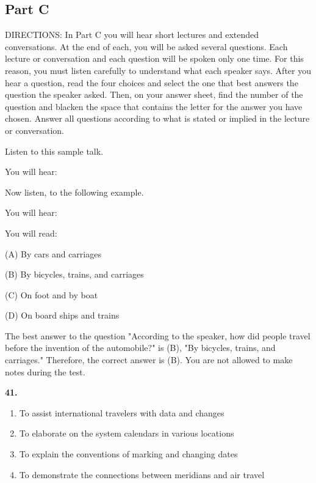 \documentclass[12pt]{article}
\begin{document}
\subsection*{Part C}
DIRECTIONS: In Part C you will hear short lectures and extended conversations. At the end of each, you will be asked several questions. Each lecture or conversation and each question will be spoken only one time. For this reason, you must listen carefully to understand what each speaker says. After you hear a question, read the four choices and select the one that best answers the question the speaker asked. Then, on your answer sheet, find the number of the question and blacken the space that contains the letter for the answer you have chosen. Answer all questions according to what is stated or implied in the lecture or conversation.\par
\begin{exampleblock}
Listen to this sample talk.\par
You will hear:\par
Now listen, to the following example.\par
You will hear:\par
You will read:\par
(A) By cars and carriages\par
(B) By bicycles, trains, and carriages\par
(C) On foot and by boat\par
(D) On board ships and trains\par
The best answer to the question "According to the speaker, how did people travel before the invention of the automobile?" is (B), "By bicycles, trains, and carriages." Therefore, the correct answer is (B). You are not allowed to make notes during the test.\par
\end{exampleblock}
\noindent\textbf{41.}
\begin{enumerate}[label=(\Alph*),leftmargin=*,itemsep=0.2em]
\item To assist international travelers with data and changes
\item To elaborate on the system calendars in various locations
\item To explain the conventions of marking and changing dates
\item To demonstrate the connections between meridians and air travel
\end{enumerate}
\par
\begingroup
\setlength{\parskip}{0pt}
\setlength{\parindent}{0pt}
\end{document}
